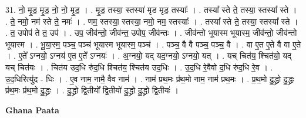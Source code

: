 \documentclass[17pt]{extarticle}
\begin{document}
31. नो॒ मृ॒ड॒ मृ॒ड॒ नो॒ नो॒ मृ॒ड॒ । . मृ॒ड॒ तस्या॒ स्तस्या॑ मृड मृड॒ तस्याः᳚ । . तस्या᳚ स्ते ते॒ तस्या॒ स्तस्या᳚ स्ते । . ते॒ नमो॒ नम॑ स्ते ते॒ नमः॑ । . णम॒ स्तस्या॒ स्तस्या॒ नमो॒ नम॒ स्तस्याः᳚ । . तस्या᳚ स्ते ते॒ तस्या॒ स्तस्या᳚ स्ते । . त॒ उपोप॑ ते त॒ उप॑ । . उप॒ जीव॑न्तो॒ जीव॑न्त॒ उपोप॒ जीव॑न्तः । . जीव॑न्तो भूयास्म भूयास्म॒ जीव॑न्तो॒ जीव॑न्तो भूयास्म । . भू॒या॒स्म॒ पञ्च॒ पञ्च॑ भूयास्म भूयास्म॒ पञ्च॑ । . पञ्च॒ वै वै पञ्च॒ पञ्च॒ वै । . वा ए॒त ए॒ते वै वा ए॒ते । . ए॒ते᳚ ऽग्नयो॒ ऽग्नय॑ ए॒त ए॒ते᳚ ऽग्नयः॑ । . अ॒ग्नयो॒ यद् यद॒ग्नयो॒ ऽग्नयो॒ यत् । . यच् चित॑य॒ श्चित॑यो॒ यद् यच् चित॑यः । . चित॑य उद॒धि रु॑द॒धि श्चित॑य॒ श्चित॑य उद॒धिः । . उ॒द॒धि रे॒वैवो द॒धि रु॑द॒धि रे॒व । . उ॒द॒धिरित्यु॑द - धिः । . ए॒व नाम॒ नामै॒ वैव नाम॑ । . नाम॑ प्रथ॒मः प्र॑थ॒मो नाम॒ नाम॑ प्रथ॒मः । . प्र॒थ॒मो दु॒द्ध्रो दु॒द्ध्रः प्र॑थ॒मः प्र॑थ॒मो दु॒द्ध्रः । . दु॒द्ध्रो द्वि॒तीयो᳚ द्वि॒तीयो॑ दु॒द्ध्रो दु॒द्ध्रो द्वि॒तीयः॑ । \newline

\textbf{Ghana Paata } \newline
\end{document}
